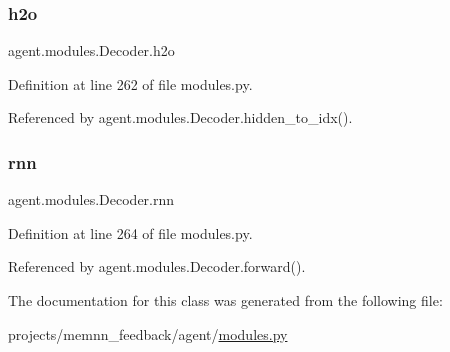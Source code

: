 \subsubsection{\texorpdfstring{h2o}{h2o}}
{\footnotesize\ttfamily agent.\+modules.\+Decoder.\+h2o}



Definition at line 262 of file modules.\+py.



Referenced by agent.\+modules.\+Decoder.\+hidden\+\_\+to\+\_\+idx().

\mbox{\label{classagent_1_1modules_1_1Decoder_af53b07597d0aef5d51ac58af511fe053}} 
\subsubsection{\texorpdfstring{rnn}{rnn}}
{\footnotesize\ttfamily agent.\+modules.\+Decoder.\+rnn}



Definition at line 264 of file modules.\+py.



Referenced by agent.\+modules.\+Decoder.\+forward().



The documentation for this class was generated from the following file\+:\begin{DoxyCompactItemize}
\item 
projects/memnn\+\_\+feedback/agent/\hyperlink{projects_2memnn__feedback_2agent_2modules_8py}{modules.\+py}\end{DoxyCompactItemize}
